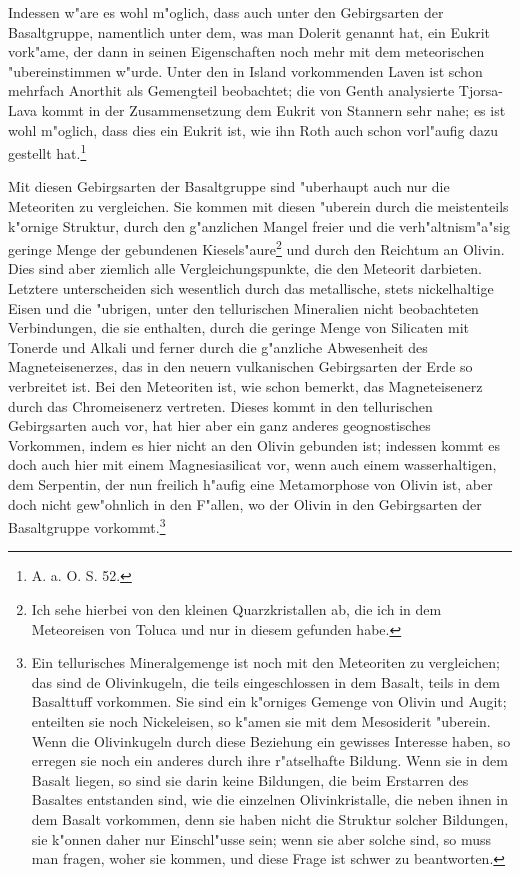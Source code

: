 \documentclass[a4paper, 11pt, oneside, german]{article}
\begin{document}
Indessen w"are es wohl m"oglich, dass auch unter den Gebirgsarten der Basaltgruppe, namentlich unter dem, was man Dolerit genannt hat, ein Eukrit vork"ame, der dann in seinen Eigenschaften noch mehr mit dem meteorischen "ubereinstimmen w"urde. Unter den in Island vorkommenden Laven ist schon mehrfach Anorthit als Gemengteil beobachtet; die von Genth analysierte Tjorsa-Lava kommt in der Zusammensetzung dem Eukrit von Stannern sehr nahe; es ist wohl m"oglich, dass dies ein Eukrit ist, wie ihn Roth auch schon vorl"aufig dazu gestellt hat.\footnote{A. a. O. S. 52.}

Mit diesen Gebirgsarten der Basaltgruppe sind "uberhaupt auch nur die Meteoriten zu vergleichen. Sie kommen mit diesen "uberein durch die meistenteils k"ornige Struktur, durch den g"anzlichen Mangel freier und die verh"altnism"a"sig geringe Menge der gebundenen Kiesels"aure\footnote{Ich sehe hierbei von den kleinen Quarzkristallen ab, die ich in dem Meteoreisen von Toluca und nur in diesem gefunden habe.} und durch den Reichtum an Olivin. Dies sind aber ziemlich alle Vergleichungspunkte, die den Meteorit darbieten. Letztere unterscheiden sich wesentlich durch das metallische, stets nickelhaltige Eisen und die "ubrigen, unter den tellurischen Mineralien nicht beobachteten Verbindungen, die sie enthalten, durch die geringe Menge von Silicaten mit Tonerde und Alkali und ferner durch die g"anzliche Abwesenheit des Magneteisenerzes, das in den neuern vulkanischen Gebirgsarten der Erde so verbreitet ist. Bei den Meteoriten ist, wie schon bemerkt, das Magneteisenerz durch das Chromeisenerz vertreten. Dieses kommt in den tellurischen Gebirgsarten auch vor, hat hier aber ein ganz anderes geognostisches Vorkommen, indem es hier nicht an den Olivin gebunden ist; indessen kommt es doch auch hier mit einem Magnesiasilicat vor, wenn auch einem wasserhaltigen, dem Serpentin, der nun freilich h"aufig eine Metamorphose von Olivin ist, aber doch nicht gew"ohnlich in den F"allen, wo der Olivin in den Gebirgsarten der Basaltgruppe vorkommt.\footnote{Ein tellurisches Mineralgemenge ist noch mit den Meteoriten zu vergleichen; das sind de Olivinkugeln, die teils eingeschlossen in dem Basalt, teils in dem Basalttuff vorkommen. Sie sind ein k"orniges Gemenge von Olivin und Augit; enteilten sie noch Nickeleisen, so k"amen sie mit dem Mesosiderit "uberein. Wenn die Olivinkugeln durch diese Beziehung ein gewisses Interesse haben, so erregen sie noch ein anderes durch ihre r"atselhafte Bildung. Wenn sie in dem Basalt liegen, so sind sie darin keine Bildungen, die beim Erstarren des Basaltes entstanden sind, wie die einzelnen Olivinkristalle, die neben ihnen in dem Basalt vorkommen, denn sie haben nicht die Struktur solcher Bildungen, sie k"onnen daher nur Einschl"usse sein; wenn sie aber solche sind, so muss man fragen, woher sie kommen, und diese Frage ist schwer zu beantworten.}
\end{document}
